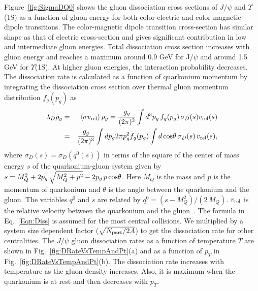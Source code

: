 \documentclass[12pt,a4paper,final]{iopart} %
\newcommand{\Jpsi}{J/\psi}
\begin{document}
Figure~\ref{fig:SigmaDQ0} shows the gluon dissociation cross sections
of $\Jpsi$ and $\Upsilon$(1S) as a function of gluon energy
for both color-electric and color-magnetic dipole transitions.
The color-magnetic dipole transition cross-section has similar shape as that of
electric cross-section and gives significant contribution 
in low and intermediate gluon energies. Total dissociation cross section increases
with gluon energy and reaches a maximum around 0.9 GeV for
J/$\psi$ and around 1.5 GeV for $\Upsilon$(1S). At higher gluon energies, the
interaction probability decreases. 
The dissociation rate is calculated as a function of quarkonium momentum 
by integrating the dissociation cross section over thermal gluon momentum 
distribution $f_{g}(p_g)$ as 
\begin{eqnarray}
\lambda_{D} \rho_{g}  & = & \langle \sigma v_{\rm rel} \rangle \,\rho_{g}  = \frac{g_g}{(2\pi)^{3}} \int d^{3}p_g \, f_{g}(p_g)  \, \sigma_{D}(s) v_{\rm rel}(s)  \nonumber \\ 
                   & = & \frac{g_g}{(2\pi)^{3}} \int dp_g 2\pi p_g^{2} f_{g}(p_g) \int d\,{\rm cos\theta}\,\sigma_{D}(s)\,v_{\rm rel}(s),
\label{Eqn:Diss}
\end{eqnarray}
where $\sigma_{D}(s) = \sigma_{D}(q^0(s))$ in terms of the square of the center of
mass energy $s$ of the quarkonium-gluon system given by
$s=M_{Q}^{2} + 2  p_g \, \sqrt{M_{Q}^2 + p^2} - 2  p_g \, p \, {\rm cos\theta}$.
Here $M_{Q}$ is the mass and $p$ is the momentum of quarkonium and $\theta$ is the angle
between the quarkonium and the gluon.
  The variables $q^0$ and $s$ are related by $q^{0} = (s-M_{Q}^{2})/(2\,M_{Q})$. 
$v_{\rm rel}$ is the relative velocity between the quarkonium and the gluon~\cite{Kumar:2014kfa}.
  The formula in Eq.~\ref{Eqn:Diss} is assumed
for the most central collisions. We multiplied by a system size dependent factor
($\sqrt{N_{\rm part}/2A}$) to get the dissociation rate for other centralities.
The $\Jpsi$ gluon dissociation rates as a function of temperature $T$ are shown in 
Fig.~\ref{fig:DRateVsTempAndPt}(a) and as a function of $p_T$ in Fig.~\ref{fig:DRateVsTempAndPt}(b).
The dissociation rate increases with temperature as the gluon density increases. 
Also, it is maximum when the quarkonium is at rest and then decreases with $p_T$.
\end{document}
